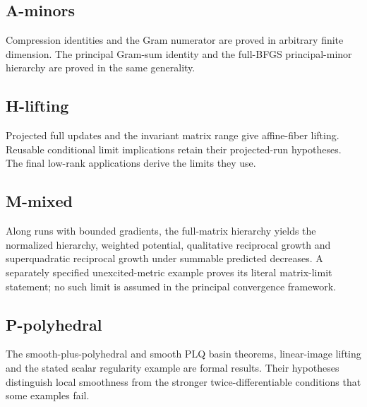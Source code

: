 

\subsection{A-minors}\label{a-minors}

Compression identities and the Gram numerator are proved in arbitrary finite dimension. The principal Gram-sum identity and the full-BFGS principal-minor hierarchy are proved in the same generality.



\subsection{H-lifting}\label{h-lifting}

Projected full updates and the invariant matrix range give affine-fiber lifting. Reusable conditional limit implications retain their projected-run hypotheses. The final low-rank applications derive the limits they use.



\subsection{M-mixed}\label{m-mixed}

Along runs with bounded gradients, the full-matrix hierarchy yields the normalized hierarchy, weighted potential, qualitative reciprocal growth and superquadratic reciprocal growth under summable predicted decreases. A separately specified unexcited-metric example proves its literal matrix-limit statement; no such limit is assumed in the principal convergence framework.



\subsection{P-polyhedral}\label{p-polyhedral}

The smooth-plus-polyhedral and smooth PLQ basin theorems, linear-image lifting and the stated scalar regularity example are formal results. Their hypotheses distinguish local smoothness from the stronger twice-differentiable conditions that some examples fail.



